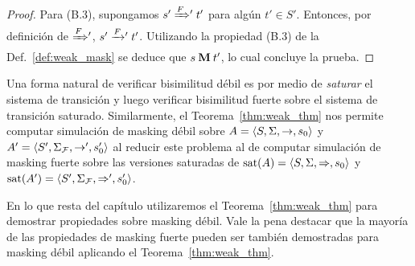 \begin{proof}
Para (B.3), supongamos $s' \mathrel{{\xRightarrow[]{F}}{}'} t'$ para algún $t' \in S'$.  Entonces, por definición de ${\mathrel{{\xRightarrow[]{F}}{}'}}$, $s' \mathrel{{\xrightarrow[]{F}}{}'} t'$.  Utilizando la propiedad (B.3) de la Def.~\ref{def:weak_mask} se deduce que $s \mathbin{\mathbf{M}} t'$, lo cual concluye la prueba.
 \qedhere 
 \end{proof} 
 
Una forma natural de verificar bisimilitud débil es por medio de \emph{saturar}
el sistema de transición  \cite{FernandezM91,Milner89} y luego verificar bisimilitud fuerte sobre el sistema de transición saturado.
Similarmente, el Teorema~\ref{thm:weak_thm} nos permite computar simulación de masking débil sobre $A =\langle S, \Sigma, \rightarrow, s_0 \rangle$ y $A' =\langle S', \Sigma_{\mathcal{F}}, \rightarrow', s'_0 \rangle$ al reducir este problema al de computar simulación de masking fuerte sobre las versiones saturadas de $\textrm{sat}(A) =\langle S, \Sigma, \Rightarrow, s_0 \rangle$ y $\textrm{sat}(A') =\langle S', \Sigma_{\mathcal{F}}, \Rightarrow', s'_0 \rangle$. 

En lo que resta del capítulo utilizaremos el Teorema~\ref{thm:weak_thm} para demostrar propiedades sobre masking débil. Vale la pena destacar que la mayoría de las propiedades de masking fuerte pueden ser también demostradas para masking débil aplicando el Teorema~\ref{thm:weak_thm}.

